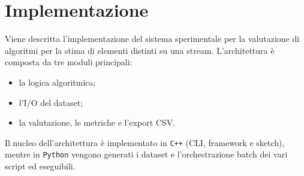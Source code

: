 \chapter{Implementazione}
\label{chp:implementazione}

Viene descritta l'implementazione del sistema sperimentale per la
valutazione di algoritmi per la stima di elementi distinti su una stream. 
L'architettura è composta da tre moduli principali:
\begin{itemize}
    \item la logica algoritmica;
    \item l'I/O del dataset;
    \item la valutazione, le metriche e l'export CSV.
\end{itemize}

Il nucleo dell'architettura è implementato in \texttt{C++} 
(CLI, framework e sketch), mentre
in \texttt{Python} vengono generati i dataset e l'orchestrazione batch dei vari script ed eseguibili.


